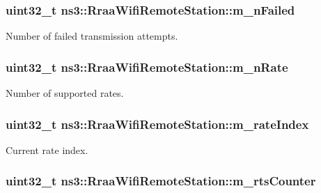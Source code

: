 \subsubsection[{\texorpdfstring{m\+\_\+n\+Failed}{m_nFailed}}]{\setlength{\rightskip}{0pt plus 5cm}uint32\+\_\+t ns3\+::\+Rraa\+Wifi\+Remote\+Station\+::m\+\_\+n\+Failed}\hypertarget{structns3_1_1RraaWifiRemoteStation_ad9920f0ba5de7d612c7b564e553e3045}{}\label{structns3_1_1RraaWifiRemoteStation_ad9920f0ba5de7d612c7b564e553e3045}


Number of failed transmission attempts. 

\subsubsection[{\texorpdfstring{m\+\_\+n\+Rate}{m_nRate}}]{\setlength{\rightskip}{0pt plus 5cm}uint32\+\_\+t ns3\+::\+Rraa\+Wifi\+Remote\+Station\+::m\+\_\+n\+Rate}\hypertarget{structns3_1_1RraaWifiRemoteStation_a82c7acaaa5cebb9db116f3f31ec40c11}{}\label{structns3_1_1RraaWifiRemoteStation_a82c7acaaa5cebb9db116f3f31ec40c11}


Number of supported rates. 

\subsubsection[{\texorpdfstring{m\+\_\+rate\+Index}{m_rateIndex}}]{\setlength{\rightskip}{0pt plus 5cm}uint32\+\_\+t ns3\+::\+Rraa\+Wifi\+Remote\+Station\+::m\+\_\+rate\+Index}\hypertarget{structns3_1_1RraaWifiRemoteStation_a709a97082ff9ac530759259f6c33233b}{}\label{structns3_1_1RraaWifiRemoteStation_a709a97082ff9ac530759259f6c33233b}


Current rate index. 

\subsubsection[{\texorpdfstring{m\+\_\+rts\+Counter}{m_rtsCounter}}]{\setlength{\rightskip}{0pt plus 5cm}uint32\+\_\+t ns3\+::\+Rraa\+Wifi\+Remote\+Station\+::m\+\_\+rts\+Counter}\hypertarget{structns3_1_1RraaWifiRemoteStation_a5693e78f4b3f58b134103bd743f27a5e}{}\label{structns3_1_1RraaWifiRemoteStation_a5693e78f4b3f58b134103bd743f27a5e}


